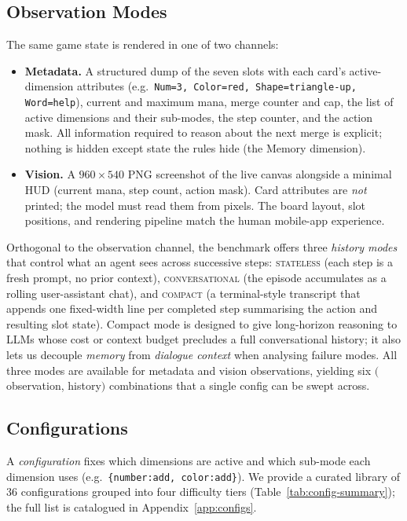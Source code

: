 \documentclass[11pt]{article}
\begin{document}
\subsection{Observation Modes}
\label{sec:obs}

The same game state is rendered in one of two channels:
\begin{itemize}
  \item \textbf{Metadata.} A structured dump of the seven slots with each
    card's active-dimension attributes (e.g.\ \texttt{Num=3, Color=red,
    Shape=triangle-up, Word=help}), current and maximum mana, merge counter
    and cap, the list of active dimensions and their sub-modes, the step
    counter, and the action mask. All information required to reason about
    the next merge is explicit; nothing is hidden except state the rules
    hide (the Memory dimension).
  \item \textbf{Vision.} A $960{\times}540$ PNG screenshot of the live
    canvas alongside a minimal HUD (current mana, step count, action mask).
    Card attributes are \emph{not} printed; the model must read them from
    pixels. The board layout, slot positions, and rendering pipeline match
    the human mobile-app experience.
\end{itemize}

Orthogonal to the observation channel, the benchmark offers three
\emph{history modes} that control what an agent sees across successive
steps: \textsc{stateless} (each step is a fresh prompt, no prior context),
\textsc{conversational} (the episode accumulates as a rolling
user-assistant chat), and \textsc{compact} (a terminal-style transcript
that appends one fixed-width line per completed step summarising the action
and resulting slot state). Compact mode is designed to give long-horizon
reasoning to LLMs whose cost or context budget precludes a full
conversational history; it also lets us decouple \emph{memory} from
\emph{dialogue context} when analysing failure modes. All three modes are
available for metadata and vision observations, yielding six $($observation,
history$)$ combinations that a single config can be swept across.

\subsection{Configurations}
\label{sec:config}

A \emph{configuration} fixes which dimensions are active and which sub-mode
each dimension uses (e.g.\ \texttt{\{number:add, color:add\}}). We provide a
curated library of 36 configurations grouped into four difficulty tiers
(Table~\ref{tab:config-summary}); the full list is catalogued in
Appendix~\ref{app:configs}.
\end{document}
